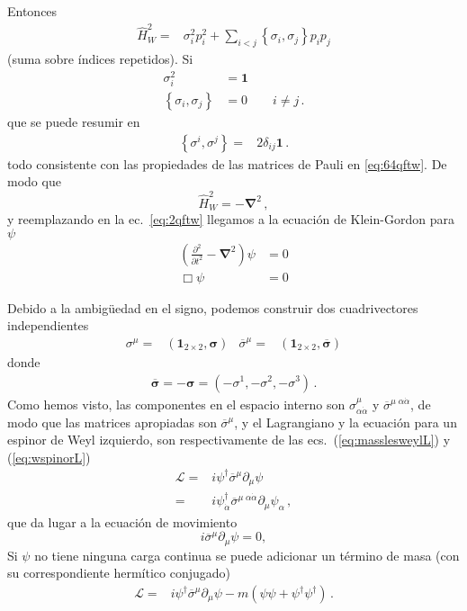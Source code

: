 \begin{frame}
Entonces
\begin{align}
  \hat{H}^2_W=& \sigma_i^2p_i^2+\sum_{i\lt j}\left\{ \sigma_i, \sigma_j\right\}p_i p_j
\end{align}
(suma sobre índices repetidos). Si
\begin{align}
  \label{eq:107qft}
   \sigma_i^2&=\mathbf{1}\nonumber\\
  \left\{ \sigma_i, \sigma_j\right\}&=0\qquad i\ne j\,.
\end{align}
que se puede resumir en
\begin{align}
  \left\{ \sigma^i,\sigma^j \right\}=&2\delta_{ij} \mathbf{1}\,.
\end{align}
todo consistente con las propiedades de las matrices de Pauli en  \eqref{eq:64qftw}. 
De modo que
\begin{equation}
  \hat{H}^2_W=-\boldsymbol{\nabla}^2\,,
\end{equation}
y reemplazando en la ec.~\eqref{eq:2qftw} llegamos a la ecuación de Klein-Gordon para $\psi$
\begin{align}
   \left(\frac{\partial^2}{\partial t^2}-\boldsymbol{\nabla}^2\right)\psi&=0\nonumber\\
   \Box\psi&=0
\end{align}
\end{frame}
Debido a la ambigüedad  en el signo, podemos construir dos cuadrivectores independientes
   \begin{align}
 \sigma^{\mu}=& \left( \mathbf{1}_{2\times2},\boldsymbol{\sigma} \right)&
 \overline{\sigma}^{\mu}=& \left( \mathbf{1}_{2\times2},\overline{\boldsymbol{\sigma}} \right)
\end{align}
donde
\begin{align}
  \overline{\boldsymbol{\sigma}}=-\boldsymbol{\sigma}=\left(-\sigma^1,-\sigma^2,-\sigma^3\right)\,.
\end{align}
Como hemos visto, las componentes en el espacio interno son
$\sigma^{\mu}_{\alpha\dot{\alpha}}$ y $\overline{\sigma}^{\mu\;\alpha\dot{\alpha}}$, de modo que  las matrices apropiadas son $\overline{\sigma}^\mu$, y el Lagrangiano  y la ecuación para un espinor de Weyl izquierdo, son respectivamente de las ecs.~(\ref{eq:masslesweylL}) y (\ref{eq:wspinorL})
\begin{align}
  \label{eq:115qft}
  \mathcal{L}=&i\psi^\dagger\overline{\sigma}^\mu\partial_\mu\psi \nonumber\\
      =&i\psi^\dagger_{\dot{\alpha}}\overline{\sigma}^{\mu\; \alpha\dot{\alpha}}\partial_\mu\psi_{\alpha}\,,
\end{align}
que da lugar a la ecuación de movimiento
\begin{equation}
  \label{eq:116qft}
  i\overline{\sigma}^\mu\partial_\mu\psi=0,
\end{equation}
Si $\psi$ no tiene ninguna carga continua se puede adicionar un término de masa (con su correspondiente hermítico conjugado)
\begin{align}
  \mathcal{L}=& i\psi^\dagger\overline{\sigma}^\mu\partial_\mu\psi -m \left( \psi\psi+\psi^{\dagger}\psi^{\dagger} \right)\,.
\end{align}

